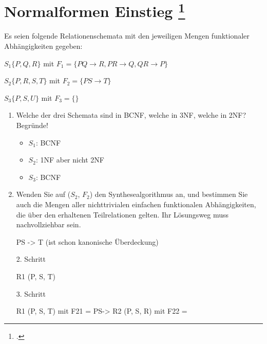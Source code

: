\documentclass{lehramt-informatik}
\begin{document}
\section{Normalformen Einstieg
\footcite[Seite 1, Aufgabe 1: Normalformen Einstieg]{db:pu:4}
}

Es seien folgende Relationenschemata mit den jeweiligen Mengen
funktionaler Abhängigkeiten gegeben:

$S_1 \{P, Q, R\}$ mit
$F_1 = \{P Q \rightarrow R, P R \rightarrow Q, QR \rightarrow P \}$

$S_2 \{P, R, S, T \}$ mit
$F_2 = \{P S \rightarrow T \}$

$S_3 \{P, S, U \}$ mit
$F_3 = \{\}$

\begin{enumerate}


\item Welche der drei Schemata sind in BCNF, welche in 3NF, welche in
2NF? Begründe!

\begin{antwort}
\begin{itemize}
\item $S_1$: BCNF

\item $S_2$: 1NF aber nicht 2NF

\item $S_3$: BCNF
\end{itemize}
\end{antwort}


\item Wenden Sie auf ($S_2$, $F_2$) den Synthesealgorithmus an, und
bestimmen Sie auch die Mengen aller nichttrivialen einfachen
funktionalen Abhängigkeiten, die über den erhaltenen Teilrelationen
gelten. Ihr Lösungsweg muss nachvollziehbar sein.

\begin{antwort}
PS -> T (ist schon kanonische Überdeckung)

2. Schritt

R1 (P, S, T)

3. Schritt

R1 (P, S, T) mit F21 = {PS->}
R2 (P, S, R) mit F22 = {}

\end{antwort}

\end{enumerate}

%
\end{document}

